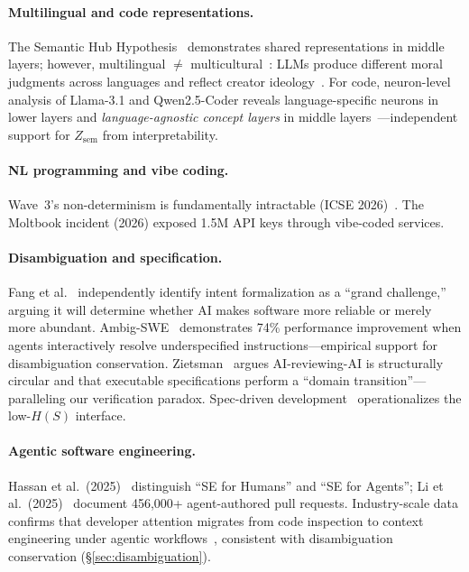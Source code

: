 \documentclass[11pt]{article}
\theoremstyle{definition}
\newcommand{\Zsem}{Z_{\text{sem}}}
\begin{document}
\paragraph{Multilingual and code representations.}
The Semantic Hub Hypothesis~\cite{wu2025semantichub} demonstrates shared representations in middle layers; however, multilingual $\neq$ multicultural~\cite{rystrom2025multicultural}: LLMs produce different moral judgments across languages and reflect creator ideology~\cite{buyl2025ideology}. For code, neuron-level analysis of Llama-3.1 and Qwen2.5-Coder reveals language-specific neurons in lower layers and \emph{language-agnostic concept layers} in middle layers~\cite{wan2025neuronguided}---independent support for $\Zsem$ from interpretability.

\paragraph{NL programming and vibe coding.}
Wave~3's non-determinism is fundamentally intractable (ICSE 2026)~\cite{icse2026reproducibility}. The Moltbook incident (2026) exposed 1.5M API keys through vibe-coded services.

\paragraph{Disambiguation and specification.}
Fang et al.~\cite{fang2026intentformalization} independently identify intent formalization as a ``grand challenge,'' arguing it will determine whether AI makes software more reliable or merely more abundant. Ambig-SWE~\cite{gao2026ambigswe} demonstrates 74\% performance improvement when agents interactively resolve underspecified instructions---empirical support for disambiguation conservation. Zietsman~\cite{zietsman2026specgate} argues AI-reviewing-AI is structurally circular and that executable specifications perform a ``domain transition''---paralleling our verification paradox. Spec-driven development~\cite{piskala2026sdd,stoica2024specifications} operationalizes the low-$H(S)$ interface.

\paragraph{Agentic software engineering.}
Hassan et al.\ (2025)~\cite{hassan2025agentic} distinguish ``SE for Humans'' and ``SE for Agents''; Li et al.\ (2025)~\cite{li2025rise} document 456,000+ agent-authored pull requests. Industry-scale data confirms that developer attention migrates from code inspection to context engineering under agentic workflows~\cite{anthropic2026agentictrends}, consistent with disambiguation conservation (\S\ref{sec:disambiguation}).
\end{document}
